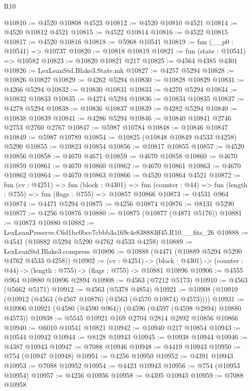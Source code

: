\begin{lexlean}{R10}
\begin{coremodule}
@10810 := @4520 @10808 @4523
@10812 := @4520 @10810 @4521
@10814 := @4520 @10812 @4521
@10815 := @4522 @10814
@10816 := @4522 @10815
@10817 := @4520 @10816
@10818 := @5968 @10541
@10819 := fun (__p0 : @10541) => @10737
@10820 := @10818 @10819
@10821 := fun (state : @10541) => @10582
@10823 := @10820 @10821 @217
@10825 := @4564 @4385 @4301
@10826 := LexLeanStd.Blake3.State.mk
@10827 := @4257 @5294
@10828 := @10826 @10827
@10829 := @4262 @5294
@10830 := @10828 @10829
@10831 := @4266 @5294
@10832 := @10830 @10831
@10833 := @4270 @5294
@10834 := @10832 @10833
@10835 := @4274 @5294
@10836 := @10834 @10835
@10837 := @4278 @5294
@10838 := @10836 @10837
@10839 := @4282 @5294
@10840 := @10838 @10839
@10841 := @4286 @5294
@10846 := @10840 @10841 @2746 @2753 @2760 @2767
@10847 := @5987 @10784
@10848 := @10846 @10847
@10849 := @5987 @10789
@10854 := @10825 (@10848 @10849 @4533 @4258) @5290
@10855 := @10823 @10854
@10856 := @10817 @10855
@10857 := @4520 @10856
@10858 := @4670 @4671
@10859 := @4670 @10858
@10860 := @4670 @10859
@10861 := @4670 @10860
@10862 := @4670 @10861
@10863 := @4670 @10862
@10864 := @4670 @10863
@10866 := @4520 @10864 @4521
@10872 := fun (cv : @4251) =>
  fun (block : @4301) =>
  fun (counter : @44) => fun (length : @755) => fun (flags : @755) => @10857 @10866
@10873 := @4531 @964
@10874 := @4471 @5294
@10875 := @4256 @10874
@10876 := @8131 @5290
@10877 := @4256 @10876
@10880 := @10875 (@10877 (@4871 @5176))
@10881 := @10873 @10880
@10882 := LexLeanPreserve.C6d1bc0bcc7cbbb3a169c4e838883ff45.R10.__fits_26
@10888 := @4541 (@10882 @5294 @5290 @4762 @4533 @4258)
@10889 := LexLeanStd.Blake3.compress
@10896 := @10888 (@4471 (@10889 @5294 @5290 @4762 @4533 @4258))
@10902 := (cv : @4251) ->
  (block : @4301) -> (counter : @44) -> (length : @755) -> (flags : @755) -> @10881 @10896
@10906 := @4555 @964 @10880 @10896 @2894
@10908 := @4563 (@7212 @5173)
@10910 := @4563 (@5662 @5171)
@10912 := @4563 (@5378 @4854)
@10921 := @10908 (@10910 (@10912 (@4563 (@4567 @10876) (@4563 (@4570 @10874) @4573))))
@10931 := @10906 @10921 (@4580 (@4590 @964)) (@4596 (@4597 (@4598 @2894) @10880 @4573))
@10938 := @5545 @10921 @169 @2704 @2814 @2892 @10856 @10866
@10940 := @6010 @10541 @10821
@10942 := @10940 @217 @10854
@10943 := @10544 @10942
@10944 := @8128 @10943
@10945 := @10938 @10944
@10946 := @4387 @10943
@10947 := @7088 @10946
@10948 := @4419 @10943
@10950 := @754 (@10947 @10948)
@10951 := @4256 @10950
@10952 := @4391 @10943
@10953 := @7088 @10952
@10954 := @4423 @10943
@10956 := @754 (@10953 @10954)
@10957 := @4256 @10956
@10958 := @4395 @10943
@10959 := @7088 @10958

\end{coremodule}
\end{lexlean}
